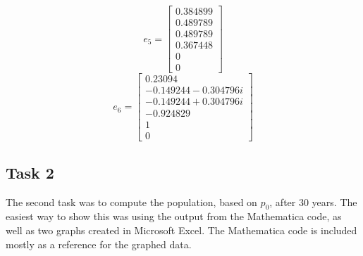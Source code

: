 \documentclass[12pt]{extarticle}
\begin{document}
\[e_5 = \begin{bmatrix}
 0.384899\\
 0.489789\\
 0.489789\\
 0.367448\\
 0\\
 0
\end{bmatrix}\]
\[e_6 = \begin{bmatrix}
 0.23094\\
 -0.149244 - 0.304796i\\
 -0.149244 + 0.304796i\\
 -0.924829\\
 1\\
 0
\end{bmatrix}\]

\subsection{Task 2}
The second task was to compute the population, based on $p_0$, after 30 years. The easiest way to show this was using the output from the Mathematica code, as well as two graphs created in Microsoft Excel. The Mathematica code is included mostly as a reference for the graphed data. 
\end{document}
